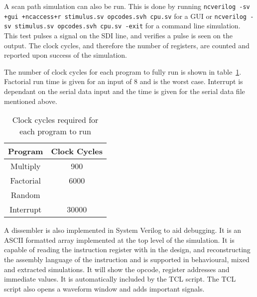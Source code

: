 
A scan path simulation can also be run.
This is done by running \texttt{ncverilog -sv +gui +ncaccess+r stimulus.sv  opcodes.svh cpu.sv} for a GUI or \texttt{ncverilog -sv stimulus.sv  opcodes.svh cpu.sv -exit} for a command line simulation.
This test pulses a signal on the SDI line, and verifies a pulse is seen on the output. 
The clock cycles, and therefore the number of registers, are counted and reported upon success of the simulation.


The number of clock cycles for each program to fully run is shown in table~\ref{tab:runtimes}. 
Factorial run time is given for an input of 8 and is the worst case. 
Interrupt is dependant on the serial data input and the time is given for the serial data file mentioned above.

\begin{table}
\centering
\caption{Clock cycles required for each program to run}
\label{tab:runtimes}
\begin{tabular}{|c|c|}
Program & Clock Cycles \\ \hline
Multiply	& 900	\\
Factorial	& 6000	\\
Random		& 	\\
Interrupt	& 30000	\\ \hline
\end{tabular}
\end{table}

A dissembler is also implemented in System Verilog to aid debugging.
It is an ASCII formatted array implemented at the top level of the simulation. 
It is capable of reading the instruction register with in the design, and reconstructing the assembly language of the instruction and is supported in behavioural, mixed and extracted simulations.
It will show the opcode, register addresses and immediate values.
It is automatically included by the TCL script.
The TCL script also opens a waveform window and adds important signals.



